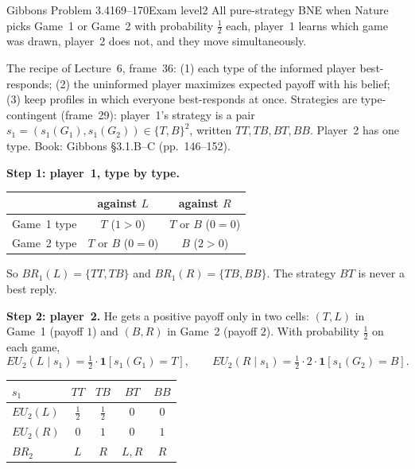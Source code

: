 \begin{exsol}{Gibbons Problem 3.4}{169--170}{Exam level}{2}
\asked All pure-strategy BNE when Nature picks Game~1 or Game~2 with probability $\frac12$ each,
player~1 learns which game was drawn, player~2 does not, and they move simultaneously.

\method The recipe of Lecture~6, frame~36: (1) each type of the informed player best-responds;
(2) the uninformed player maximizes expected payoff with his belief; (3) keep profiles in which
everyone best-responds at once. Strategies are type-contingent (frame~29): player~1's strategy is a
pair $s_1 = (s_1(G_1), s_1(G_2)) \in \{T,B\}^2$, written $TT, TB, BT, BB$. Player~2 has one type.
Book: Gibbons \S3.1.B--C (pp.~146--152).

\solution
\textbf{Step 1: player~1, type by type.}
\begin{center}
\begin{tabular}{l|cc}
& against $L$ & against $R$\\\hline
Game~1 type & $T$ ($1 > 0$) & $T$ or $B$ ($0 = 0$)\\
Game~2 type & $T$ or $B$ ($0 = 0$) & $B$ ($2 > 0$)
\end{tabular}
\end{center}
So $BR_1(L) = \{TT, TB\}$ and $BR_1(R) = \{TB, BB\}$. The strategy $BT$ is never a best reply.

\textbf{Step 2: player~2.} He gets a positive payoff only in two cells: $(T,L)$ in Game~1 (payoff
$1$) and $(B,R)$ in Game~2 (payoff $2$). With probability $\frac12$ on each game,
\[
  EU_2(L \mid s_1) = \tfrac12\cdot\mathbf 1[s_1(G_1) = T], \qquad
  EU_2(R \mid s_1) = \tfrac12\cdot 2\cdot\mathbf 1[s_1(G_2) = B].
\]
\begin{center}
\begin{tabular}{l|cccc}
$s_1$ & $TT$ & $TB$ & $BT$ & $BB$\\\hline
$EU_2(L)$ & $\frac12$ & $\frac12$ & $0$ & $0$\\
$EU_2(R)$ & $0$ & $1$ & $0$ & $1$\\
$BR_2$ & $L$ & $R$ & $L, R$ & $R$
\end{tabular}
\end{center}


\end{exsol}
